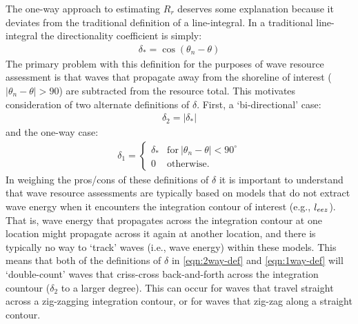 The one-way approach to estimating $R_r$ deserves some explanation because it deviates from the traditional definition of a line-integral. In a traditional line-integral the directionality coefficient is simply:
\begin{align}
    \delta_{*} = \cos(\theta_n - \theta)
    \label{eqn:trad-def}
\end{align}
The primary problem with this definition for the purposes of wave resource assessment is that waves that propagate away from the shoreline of interest ($|\theta_n - \theta|>90$) are subtracted from the resource total. This motivates consideration of two alternate definitions of $\delta$. First, a `bi-directional' case:
\begin{align}
    \delta_2 = |\delta_{*}|
    \label{eqn:2way-def}
\end{align}
and the one-way case:
\begin{align}
    \delta_1 = 
    \begin{cases}
     \delta_* & \mathrm{for\ }|\theta_n - \theta|<90^\circ \\
    0 & \mathrm{otherwise}.
    \end{cases}
    \label{eqn:1way-def}
\end{align}
In weighing the pros/cons of these definitions of $\delta$ it is important to understand that wave resource assessments are typically based on models that do not extract wave energy when it encounters the integration contour of interest (e.g., $l_{eez}$). That is, wave energy that propagates across the integration contour at one location might propagate across it again at another location, and there is typically no way to `track' waves (i.e., wave energy) within these models.
This means that both of the definitions of $\delta$ in \eqref{eqn:2way-def} and \eqref{eqn:1way-def} will `double-count' waves that criss-cross back-and-forth across the integration countour ($\delta_2$ to a larger degree). This can occur for waves that travel straight across a zig-zagging integration contour, or for waves that zig-zag along a straight contour. 

